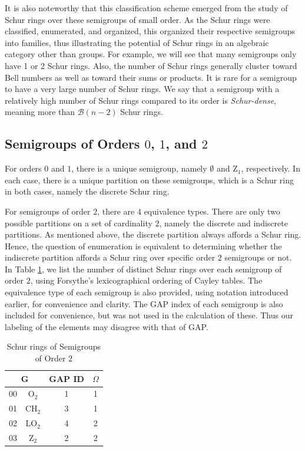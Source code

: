 \documentclass{article}
\theoremstyle{plain}
\theoremstyle{definition}
\newcommand{\B}{\mathscr{B}}
\renewcommand{\O}{\mathrm{O}}
\newcommand{\LO}{\mathrm{LO}}
\newcommand{\CH}{\mathrm{CH}}
\newcommand{\z}{\mathrm{Z}}
\begin{document}
It is also noteworthy that this classification scheme emerged from the study of Schur rings over these semigroups of small order. As the Schur rings were classified, enumerated, and organized, this organized their respective semigroups into families, thus illustrating the potential of Schur rings in an algebraic category other than groups. For example, we will see that many semigroups only have 1 or 2 Schur rings. Also, the number of Schur rings generally cluster toward Bell numbers as well as toward their sums or products. It is rare for a semigroup to have a very large number of Schur rings. We say that a semigroup with a relatively high number of Schur rings compared to its order is \emph{Schur-dense}, meaning more than $\B(n-2)$ Schur rings.

\subsection{Semigroups of Orders $0$, $1$, and $2$}
For orders $0$ and $1$, there is a unique semigroup, namely $\emptyset$ and $\z_1$, respectively. In each case, there is a unique partition on these semigroups, which is a Schur ring in both cases, namely the discrete Schur ring. 

For semigroups of order $2$, there are $4$ equivalence types. There are only two possible partitions on a set of cardinality $2$, namely the discrete and indiscrete partitions. As mentioned above, the discrete partition always affords a Schur ring. Hence, the question of enumeration is equivalent to determining whether the indiscrete partition affords a Schur ring over specific order $2$ semigroups or not. In Table \ref{fig:sgsr2}, we list the number of distinct Schur rings over each semigroup of order $2$, using Forsythe's lexicographical ordering of Cayley tables. The equivalence type of each semigroup is also provided, using notation introduced earlier, for convenience and clarity. The GAP index of each semigroup is also included for convenience, but was not used in the calculation of these. Thus our labeling of the elements may disagree with that of GAP.

\begin{table}[ht]
\begin{center}
\begin{tabular}{ccc|c}
\multicolumn{2}{c}{G} & GAP ID  & $\Omega$\\
\hline
00 & $\O_2$ & 1 & 1\\
01 & $\CH_2$ & 3 & 1 \\
02 & $\LO_2$ & 4 & 2 \\
03 & $\z_2$ & 2 & 2
\end{tabular}
\end{center}
\caption{Schur rings of Semigroups of Order $2$}
\label{fig:sgsr2}
\end{table}
\end{document}
